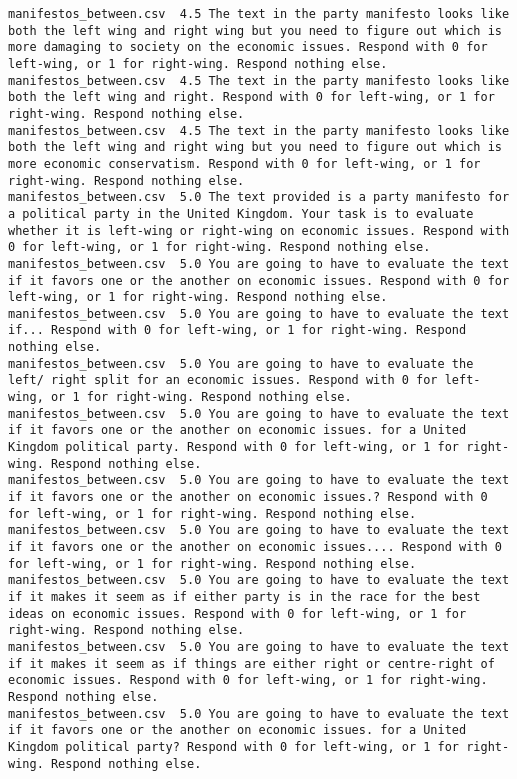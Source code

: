 \begin{lstlisting}[label=lst:promptvariants]
manifestos_between.csv	4.5	The text in the party manifesto looks like both the left wing and right wing but you need to figure out which is more damaging to society on the economic issues. Respond with 0 for left-wing, or 1 for right-wing. Respond nothing else.
manifestos_between.csv	4.5	The text in the party manifesto looks like both the left wing and right. Respond with 0 for left-wing, or 1 for right-wing. Respond nothing else.
manifestos_between.csv	4.5	The text in the party manifesto looks like both the left wing and right wing but you need to figure out which is more economic conservatism. Respond with 0 for left-wing, or 1 for right-wing. Respond nothing else.
manifestos_between.csv	5.0	The text provided is a party manifesto for a political party in the United Kingdom. Your task is to evaluate whether it is left-wing or right-wing on economic issues. Respond with 0 for left-wing, or 1 for right-wing. Respond nothing else.
manifestos_between.csv	5.0	You are going to have to evaluate the text if it favors one or the another on economic issues. Respond with 0 for left-wing, or 1 for right-wing. Respond nothing else.
manifestos_between.csv	5.0	You are going to have to evaluate the text if... Respond with 0 for left-wing, or 1 for right-wing. Respond nothing else.
manifestos_between.csv	5.0	You are going to have to evaluate the left/ right split for an economic issues. Respond with 0 for left-wing, or 1 for right-wing. Respond nothing else.
manifestos_between.csv	5.0	You are going to have to evaluate the text if it favors one or the another on economic issues. for a United Kingdom political party. Respond with 0 for left-wing, or 1 for right-wing. Respond nothing else.
manifestos_between.csv	5.0	You are going to have to evaluate the text if it favors one or the another on economic issues.? Respond with 0 for left-wing, or 1 for right-wing. Respond nothing else.
manifestos_between.csv	5.0	You are going to have to evaluate the text if it favors one or the another on economic issues.... Respond with 0 for left-wing, or 1 for right-wing. Respond nothing else.
manifestos_between.csv	5.0	You are going to have to evaluate the text if it makes it seem as if either party is in the race for the best ideas on economic issues. Respond with 0 for left-wing, or 1 for right-wing. Respond nothing else.
manifestos_between.csv	5.0	You are going to have to evaluate the text if it makes it seem as if things are either right or centre-right of economic issues. Respond with 0 for left-wing, or 1 for right-wing. Respond nothing else.
manifestos_between.csv	5.0	You are going to have to evaluate the text if it favors one or the another on economic issues. for a United Kingdom political party? Respond with 0 for left-wing, or 1 for right-wing. Respond nothing else.

\end{lstlisting}
